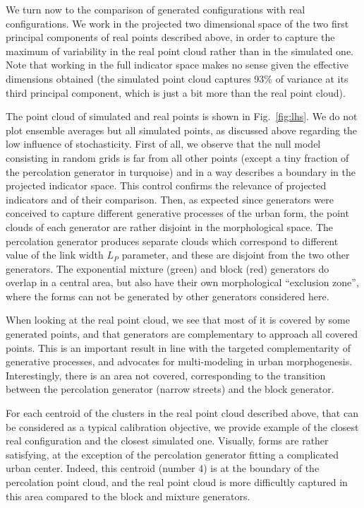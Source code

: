 \documentclass[letterpaper]{article}
\begin{document}
We turn now to the comparison of generated configurations with real configurations. We work in the projected two dimensional space of the two first principal components of real points described above, in order to capture the maximum of variability in the real point cloud rather than in the simulated one. Note that working in the full indicator space makes no sense given the effective dimensions obtained (the simulated point cloud captures 93\% of variance at its third principal component, which is just a bit more than the real point cloud).


The point cloud of simulated and real points is shown in Fig.~\ref{fig:lhs}. We do not plot ensemble averages but all simulated points, as discussed above regarding the low influence of stochasticity. First of all, we observe that the null model consisting in random grids is far from all other points (except a tiny fraction of the percolation generator in turquoise) and in a way describes a boundary in the projected indicator space. This control confirms the relevance of projected indicators and of their comparison. 
Then, as expected since generators were conceived to capture different generative processes of the urban form, the point clouds of each generator are rather disjoint in the morphological space. The percolation generator produces separate clouds which correspond to different value of the link width $L_P$ parameter, and these are disjoint from the two other generators. The exponential mixture (green) and block (red) generators do overlap in a central area, but also have their own morphological ``exclusion zone'', where the forms can not be generated by other generators considered here.

When looking at the real point cloud, we see that most of it is covered by some generated points, and that generators are complementary to approach all covered points. This is an important result in line with the targeted complementarity of generative processes, and advocates for multi-modeling in urban morphogenesis. Interestingly, there is an area not covered, corresponding to the transition between the percolation generator (narrow streets) and the block generator.

For each centroid of the clusters in the real point cloud described above, that can be considered as a typical calibration objective, we provide example of the closest real configuration and the closest simulated one. Visually, forms are rather satisfying, at the exception of the percolation generator fitting a complicated urban center. Indeed, this centroid (number 4) is at the boundary of the percolation point cloud, and the real point cloud is more difficultly captured in this area compared to the block and mixture generators.
\end{document}
